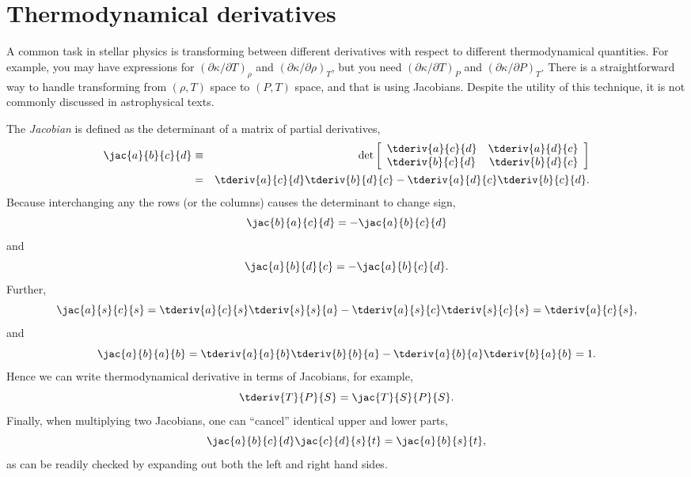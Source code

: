 \section{Thermodynamical derivatives}
\label{s.thermo-derivatives}

A common task in stellar physics is transforming between different derivatives with respect to different thermodynamical quantities.  For example, you may have expressions for $(\partial \kappa/\partial T)_{\rho}$ and $(\partial \kappa/\partial \rho)_{T}$, but you need $(\partial\kappa/\partial T)_{P}$ and $(\partial\kappa/\partial P)_{T}$.  There is a straightforward way to handle transforming from $(\rho,T)$ space to $(P,T)$ space, and that is using Jacobians.  Despite the utility of this technique, it is not commonly discussed in astrophysical texts\cite{landau80:_statis_physic}.

The \emph{Jacobian} is defined as the determinant of a matrix of partial derivatives,
\begin{eqnarray}
\jac{a}{b}{c}{d} &\equiv& \det\left[
	\begin{array}{lr}\tderiv{a}{c}{d} & \tderiv{a}{d}{c}\\
	\tderiv{b}{c}{d} & \tderiv{b}{d}{c} \end{array}\right] \nonumber \\
 & = & \tderiv{a}{c}{d}\tderiv{b}{d}{c} - \tderiv{a}{d}{c}\tderiv{b}{c}{d}.
 \end{eqnarray}
Because interchanging any the rows (or the columns) causes the determinant to change sign, 
\begin{equation}
\jac{b}{a}{c}{d} = -\jac{a}{b}{c}{d}
\end{equation}
and
\begin{equation}
\jac{a}{b}{d}{c} = -\jac{a}{b}{c}{d}.
\end{equation}
Further,
\begin{equation}
\jac{a}{s}{c}{s} = \tderiv{a}{c}{s}\tderiv{s}{s}{a} - \tderiv{a}{s}{c}\tderiv{s}{c}{s} = \tderiv{a}{c}{s},
\end{equation}
and
\begin{equation}
\jac{a}{b}{a}{b} = \tderiv{a}{a}{b}\tderiv{b}{b}{a} - \tderiv{a}{b}{a}\tderiv{b}{a}{b} = 1.
\end{equation}
Hence we can write thermodynamical derivative in terms of Jacobians, for example,
\begin{equation}
\tderiv{T}{P}{S} = \jac{T}{S}{P}{S}.
\end{equation}
Finally, when multiplying two Jacobians, one can ``cancel'' identical upper and lower parts,
\begin{equation}
\jac{a}{b}{c}{d}\jac{c}{d}{s}{t} =\jac{a}{b}{s}{t},
\end{equation}
as can be readily checked by expanding out both the left and right hand sides.

